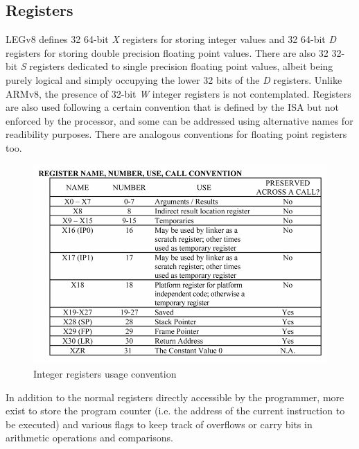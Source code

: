 \subsection*{Registers}
LEGv8 defines 32 64-bit \emph{X} registers for storing integer values and 32 64-bit \emph{D} registers for storing double precision floating point values. There are also 32 32-bit \emph{S} registers dedicated to single precision floating point values, albeit being purely logical and simply occupying the lower 32 bits of the \emph{D} registers. Unlike ARMv8, the presence of 32-bit \emph{W} integer registers is not contemplated.
\newline
Registers are also used following a certain convention that is defined by the ISA but not enforced by the processor, and some can be addressed using alternative names for readibility purposes. There are analogous conventions for floating point registers too.
\begin{figure}[H]
	\centering
	\includegraphics[width=.8\textwidth]{img/registers_conventions.png}
	\caption{Integer registers usage convention}
\end{figure}
\newline

In addition to the normal registers directly accessible by the programmer, more exist to store the program counter (i.e. the address of the current instruction to be executed) and various flags to keep track of overflows or carry bits in arithmetic operations and comparisons.
